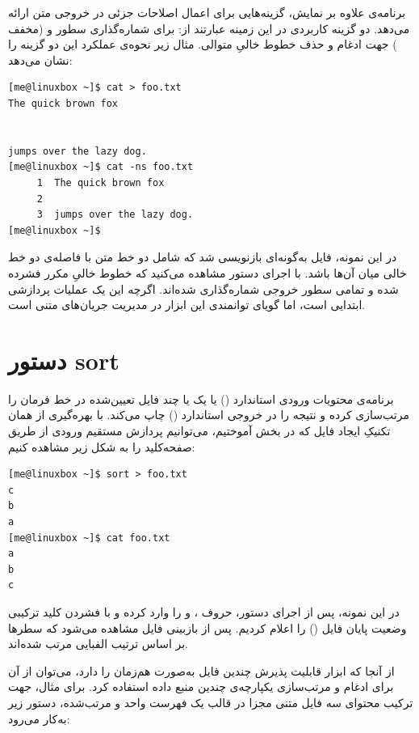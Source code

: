 برنامه‌ی  علاوه بر نمایش، گزینه‌هایی برای اعمال اصلاحات جزئی در خروجی متن ارائه می‌دهد. دو گزینه کاربردی در این زمینه عبارتند از:  برای شماره‌گذاری سطور و  (مخفف ) جهت ادغام و حذف خطوط خالیِ متوالی. مثال زیر نحوه‌ی عملکرد این دو گزینه را نشان می‌دهد:

\begin{latin}
\begin{lstlisting}
[me@linuxbox ~]$ cat > foo.txt
The quick brown fox


jumps over the lazy dog.
[me@linuxbox ~]$ cat -ns foo.txt
     1  The quick brown fox
     2
     3  jumps over the lazy dog.
[me@linuxbox ~]$
\end{lstlisting}
\end{latin}

در این نمونه، فایل  به‌گونه‌ای بازنویسی شد که شامل دو خط متن با فاصله‌ی دو خط خالی میان آن‌ها باشد. با اجرای دستور  مشاهده می‌کنید که خطوط خالیِ مکرر فشرده شده و تمامی سطور خروجی شماره‌گذاری شده‌اند. اگرچه این یک عملیات پردازشی ابتدایی است، اما گویای توانمندی این ابزار در مدیریت جریان‌های متنی است.

\section{دستور sort}

برنامه‌ی  محتویات ورودی استاندارد () یا یک یا چند فایل تعیین‌شده در خط فرمان را مرتب‌سازی کرده و نتیجه را در خروجی استاندارد () چاپ می‌کند. با بهره‌گیری از همان تکنیکِ ایجاد فایل که در بخش  آموختیم، می‌توانیم پردازش مستقیم ورودی از طریق صفحه‌کلید را به شکل زیر مشاهده کنیم:

\begin{latin}
\begin{lstlisting}
[me@linuxbox ~]$ sort > foo.txt
c
b
a
[me@linuxbox ~]$ cat foo.txt
a
b
c
\end{lstlisting}
\end{latin}

در این نمونه، پس از اجرای دستور، حروف ،  و  را وارد کرده و با فشردن کلید ترکیبی  وضعیت پایان فایل () را اعلام کردیم. پس از بازبینی فایل  مشاهده می‌شود که سطرها بر اساس ترتیب الفبایی مرتب شده‌اند.

از آنجا که ابزار  قابلیت پذیرش چندین فایل به‌صورت هم‌زمان را دارد، می‌توان از آن برای ادغام و مرتب‌سازی یکپارچه‌ی چندین منبع داده استفاده کرد. برای مثال، جهت ترکیب محتوای سه فایل متنی مجزا در قالب یک فهرست واحد و مرتب‌شده، دستور زیر به‌کار می‌رود:

